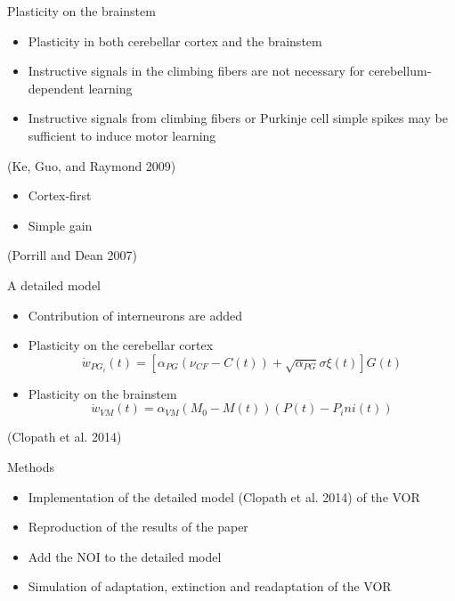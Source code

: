 \documentclass[ignorenonframetext,]{beamer}
\begin{document}
\begin{frame}{Plasticity on the brainstem}

\begin{itemize}
\itemsep1pt\parskip0pt
\item
  Plasticity in both cerebellar cortex and the brainstem
\item
  Instructive signals in the climbing fibers are not necessary for
  cerebellum-dependent learning
\item
  Instructive signals from climbing fibers or Purkinje cell simple
  spikes may be sufficient to induce motor learning
\end{itemize}

(Ke, Guo, and Raymond 2009)

\begin{itemize}
\itemsep1pt\parskip0pt
\item
  Cortex-first
\item
  Simple gain
\end{itemize}

(Porrill and Dean 2007)

\end{frame}

\begin{frame}{A detailed model}

\begin{itemize}
\item
  Contribution of interneurons are added
\item
  Plasticity on the cerebellar cortex
  \[\dot{w}_{PG_i}(t) = [ \alpha_{PG}( \nu_{CF}-C(t)) +  \sqrt{ \alpha_{PG}}  \sigma  \xi (t)]G(t)\]
\item
  Plasticity on the brainstem
  \[\dot{w}_{VM}(t) = \alpha_{VM}(M_0-M(t))(P(t)-P_ini(t))\]
\end{itemize}

(Clopath et al. 2014)

\end{frame}

\begin{frame}{Methods}

\begin{itemize}
\itemsep1pt\parskip0pt
\item
  Implementation of the detailed model (Clopath et al. 2014) of the VOR
\item
  Reproduction of the results of the paper
\item
  Add the NOI to the detailed model
\item
  Simulation of adaptation, extinction and readaptation of the VOR
\end{itemize}

\end{frame}
\end{document}

